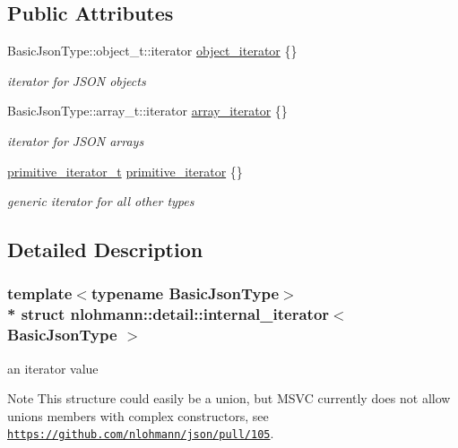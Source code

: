 \subsection*{Public Attributes}
\begin{DoxyCompactItemize}
\item 
Basic\+Json\+Type\+::object\+\_\+t\+::iterator \hyperlink{structnlohmann_1_1detail_1_1internal__iterator_a8cb0af3498061426c1d0a65ad6220408}{object\+\_\+iterator} \{\}
\begin{DoxyCompactList}\small\item\em iterator for J\+S\+ON objects \end{DoxyCompactList}\item 
Basic\+Json\+Type\+::array\+\_\+t\+::iterator \hyperlink{structnlohmann_1_1detail_1_1internal__iterator_a8294a6e6f01b58e1cce8fbae66a50b5d}{array\+\_\+iterator} \{\}
\begin{DoxyCompactList}\small\item\em iterator for J\+S\+ON arrays \end{DoxyCompactList}\item 
\hyperlink{classnlohmann_1_1detail_1_1primitive__iterator__t}{primitive\+\_\+iterator\+\_\+t} \hyperlink{structnlohmann_1_1detail_1_1internal__iterator_a2b3bb45f968210e42c282017eeeb63a8}{primitive\+\_\+iterator} \{\}
\begin{DoxyCompactList}\small\item\em generic iterator for all other types \end{DoxyCompactList}\end{DoxyCompactItemize}


\subsection{Detailed Description}
\subsubsection*{template$<$typename Basic\+Json\+Type$>$\\*
struct nlohmann\+::detail\+::internal\+\_\+iterator$<$ Basic\+Json\+Type $>$}

an iterator value 

\begin{DoxyNote}{Note}
This structure could easily be a union, but M\+S\+VC currently does not allow unions members with complex constructors, see \href{https://github.com/nlohmann/json/pull/105}{\tt https\+://github.\+com/nlohmann/json/pull/105}. 
\end{DoxyNote}


